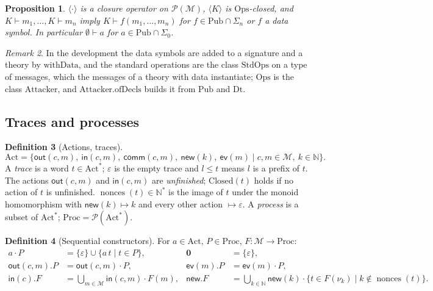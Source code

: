 \documentclass[11pt]{article}
\theoremstyle{definition}
\newtheorem{definition}{Definition}[section]
\theoremstyle{plain}
\newtheorem{proposition}[definition]{Proposition}
\theoremstyle{remark}
\newtheorem{remark}[definition]{Remark}
\newcommand{\N}{\mathbb{N}}
\newcommand{\Ops}{\mathrm{Ops}}
\newcommand{\Pub}{\mathrm{Pub}}
\newcommand{\Dt}{\mathrm{Dt}}
\newcommand{\Act}{\mathrm{Act}}
\newcommand{\Proc}{\mathrm{Proc}}
\newcommand{\Closed}{\mathrm{Closed}}
\newcommand{\nonces}{\operatorname{nonces}}
\begin{document}
\begin{proposition}
$\langle\cdot\rangle$ is a closure operator on $\mathcal{P}(\mathcal{M})$, $\langle K\rangle$ is $\Ops$-closed, and $K\vdash m_1,\dots,K\vdash m_n$ imply $K\vdash f(m_1,\dots,m_n)$ for $f\in\Pub\cap\Sigma_n$ or $f$ a data symbol. In particular $\emptyset\vdash a$ for $a\in\Pub\cap\Sigma_0$.
\end{proposition}

\begin{remark}
In the development the data symbols are added to a signature and a theory by $\mathrm{withData}$, and the standard operations are the class $\mathrm{StdOps}$ on a type of messages, which the messages of a theory with data instantiate; $\Ops$ is the class $\mathrm{Attacker}$, and $\mathrm{Attacker.ofDecls}$ builds it from $\Pub$ and $\Dt$.
\end{remark}

\subsection{Traces and processes}

\begin{definition}[Actions, traces]
\[
\Act=\{\mathsf{out}(c,m),\ \mathsf{in}(c,m),\ \mathsf{comm}(c,m),\ \mathsf{new}(k),\ \mathsf{ev}(m)\mid c,m\in\mathcal{M},\ k\in\N\}.
\]
A \emph{trace} is a word $t\in\Act^*$; $\varepsilon$ is the empty trace and $l\le t$ means $l$ is a prefix of $t$. The actions $\mathsf{out}(c,m)$ and $\mathsf{in}(c,m)$ are \emph{unfinished}; $\Closed(t)$ holds if no action of $t$ is unfinished. $\nonces(t)\in\N^*$ is the image of $t$ under the monoid homomorphism with $\mathsf{new}(k)\mapsto k$ and every other action $\mapsto\varepsilon$. A \emph{process} is a subset of $\Act^*$; $\Proc=\mathcal{P}(\Act^*)$.
\end{definition}

\begin{definition}[Sequential constructors]\label{def:seq}
For $a\in\Act$, $P\in\Proc$, $F:\mathcal{M}\to\Proc$:
\begin{align*}
a\cdot P &= \{\varepsilon\}\cup\{a\,t\mid t\in P\}, &
\mathbf{0} &= \{\varepsilon\},\\
\mathsf{out}(c,m).P &= \mathsf{out}(c,m)\cdot P, &
\mathsf{ev}(m).P &= \mathsf{ev}(m)\cdot P,\\
\mathsf{in}(c).F &= \textstyle\bigcup_{m\in\mathcal{M}}\mathsf{in}(c,m)\cdot F(m), &
\mathsf{new}.F &= \textstyle\bigcup_{k\in\N}\mathsf{new}(k)\cdot\{t\in F(\nu_k)\mid k\notin\nonces(t)\}.
\end{align*}
\end{definition}
\end{document}
